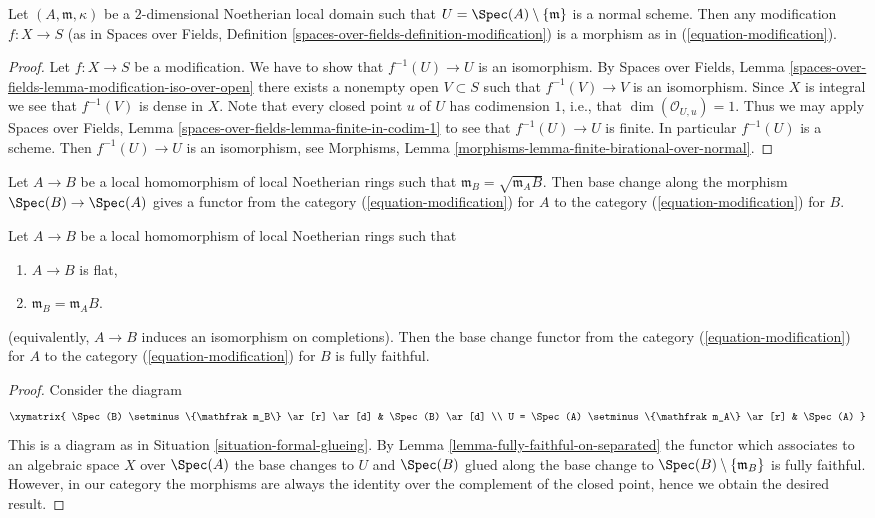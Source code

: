\begin{lemma}
\label{lemma-modification}
Let $(A, \mathfrak m, \kappa)$ be a $2$-dimensional Noetherian
local domain such that $U = \Spec(A) \setminus \{\mathfrak m\}$
is a normal scheme. Then any modification $f : X \to S$
(as in Spaces over Fields, Definition
\ref{spaces-over-fields-definition-modification})
is a morphism as in (\ref{equation-modification}).
\end{lemma}

\begin{proof}
Let $f : X \to S$ be a modification. We have to show that
$f^{-1}(U) \to U$ is an isomorphism. By
Spaces over Fields, Lemma
\ref{spaces-over-fields-lemma-modification-iso-over-open}
there exists a nonempty open $V \subset S$ such that $f^{-1}(V) \to V$
is an isomorphism. Since $X$ is integral we see that $f^{-1}(V)$ is
dense in $X$. Note that every closed point $u$ of $U$ has codimension
$1$, i.e., that $\dim(\mathcal{O}_{U, u}) = 1$. Thus we may apply
Spaces over Fields, Lemma \ref{spaces-over-fields-lemma-finite-in-codim-1}
to see that $f^{-1}(U) \to U$ is finite. In particular $f^{-1}(U)$ is a scheme.
Then $f^{-1}(U) \to U$ is an isomorphism, see
Morphisms, Lemma \ref{morphisms-lemma-finite-birational-over-normal}.
\end{proof}

\noindent
Let $A \to B$ be a local homomorphism of local Noetherian rings
such that $\mathfrak m_B = \sqrt{\mathfrak m_A B}$. Then base
change along the morphism $\Spec(B) \to \Spec(A)$ gives a functor
from the category (\ref{equation-modification}) for $A$
to the category (\ref{equation-modification}) for $B$.

\begin{lemma}
\label{lemma-fully-faithfulness-to-completion}
Let $A \to B$ be a local homomorphism of local Noetherian rings such that
\begin{enumerate}
\item $A \to B$ is flat,
\item $\mathfrak m_B = \mathfrak m_A B$.
\end{enumerate}
(equivalently, $A \to B$ induces an isomorphism on completions).
Then the base change functor from the category
(\ref{equation-modification}) for $A$ to the category
(\ref{equation-modification}) for $B$
is fully faithful.
\end{lemma}

\begin{proof}
Consider the diagram
$$
\xymatrix{
\Spec(B) \setminus \{\mathfrak m_B\} \ar[r] \ar[d] & \Spec(B) \ar[d] \\
U = \Spec(A) \setminus \{\mathfrak m_A\} \ar[r] & \Spec(A)
}
$$
This is a diagram as in Situation \ref{situation-formal-glueing}.
By Lemma \ref{lemma-fully-faithful-on-separated} the functor which
associates to an algebraic space
$X$ over $\Spec(A)$ the base changes to $U$ and $\Spec(B)$
glued along the base change to $\Spec(B) \setminus \{\mathfrak m_B\}$
is fully faithful. However, in our category the morphisms are always
the identity over the complement of the closed point, hence we
obtain the desired result.
\end{proof}

